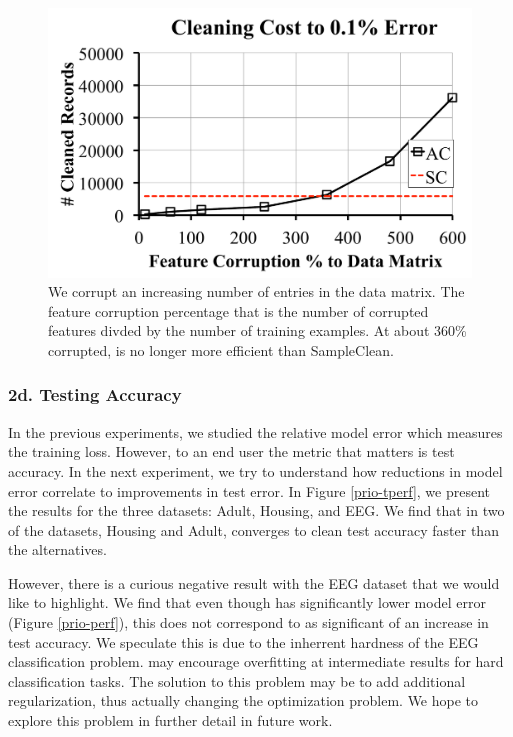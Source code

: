 \begin{figure}[ht!]
\centering
 \includegraphics[width=\columnwidth]{exp/exp9.pdf}
 \caption{We corrupt an increasing number of entries in the data matrix. The feature corruption percentage that is the number of corrupted features divded by the number of training examples. At about 360\% corrupted, \sys is no longer more efficient than SampleClean. \label{bias}}
\end{figure}

\subsubsection{2d. Testing Accuracy}
In the previous experiments, we studied the relative model error which measures the training loss. 
However, to an end user the metric that matters is test accuracy.
In the next experiment, we try to understand how reductions in model error correlate to improvements in test error.
In Figure \ref{prio-tperf}, we present the results for the three datasets: Adult, Housing, and EEG.
We find that in two of the datasets, Housing and Adult, \sys converges to clean test accuracy faster than the alternatives.

However, there is a curious negative result with the EEG dataset that we would like to highlight. 
We find that even though \sys has significantly lower model error (Figure \ref{prio-perf}), this does not correspond to as significant of an increase in test accuracy.
We speculate this is due to the inherrent hardness of the EEG classification problem.
\sys may encourage overfitting at intermediate results for hard classification tasks.
The solution to this problem may be to add additional regularization, thus actually changing the optimization problem.
We hope to explore this problem in further detail in future work.

